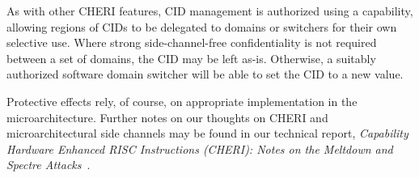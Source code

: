 As with other CHERI features, CID management is authorized using a capability,
allowing regions of CIDs to be delegated to domains or switchers for their
own selective use.
Where strong side-channel-free confidentiality is not required between a set
of domains, the CID may be left as-is.
Otherwise, a suitably authorized software domain switcher will be able to set
the CID to a new value.

Protective effects rely, of course, on appropriate implementation in the
microarchitecture.
Further notes on our thoughts on CHERI and microarchitectural side channels
may be found in our technical report, \textit{Capability Hardware Enhanced
RISC Instructions (CHERI): Notes on the Meltdown and Spectre Attacks}~\cite{UCAM-CL-TR-916}.

